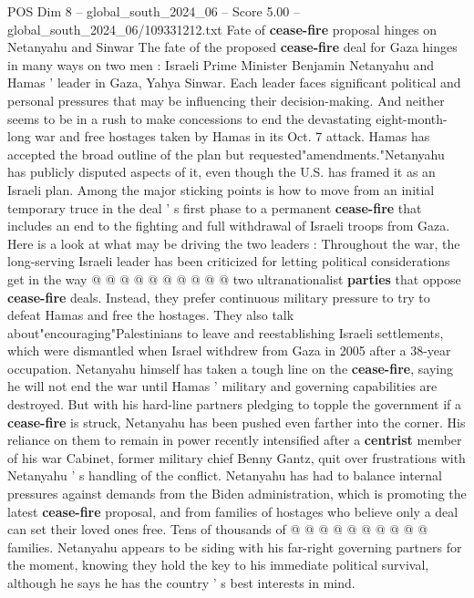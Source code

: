 \begin{textsample}{POS Dim 8 – global\_south\_2024\_06 – Score 5.00 – global\_south\_2024\_06/109331212.txt}  \label{ex:f8_pos_215}
Fate of \textbf{cease-fire} proposal hinges on Netanyahu and Sinwar The fate of the proposed \textbf{cease-fire} deal for Gaza hinges in many ways on two men : Israeli Prime Minister Benjamin Netanyahu and Hamas ' leader in Gaza, Yahya Sinwar.
Each leader faces significant political and personal pressures that may be influencing their decision-making.
And neither seems to be in a rush to make concessions to end the devastating eight-month-long war and free hostages taken by Hamas in its Oct. 7 attack.
Hamas has accepted the broad outline of the plan but requested"amendments."Netanyahu has publicly disputed aspects of it, even though the U.S. has framed it as an Israeli plan.
Among the major sticking points is how to move from an initial temporary truce in the deal ' s first phase to a permanent \textbf{cease-fire} that includes an end to the fighting and full withdrawal of Israeli troops from Gaza.
Here is a look at what may be driving the two leaders : Throughout the war, the long-serving Israeli leader has been criticized for letting political considerations get in the way @ @ @ @ @ @ @ @ @ @ two ultranationalist \textbf{parties} that oppose \textbf{cease-fire} deals.
Instead, they prefer continuous military pressure to try to defeat Hamas and free the hostages.
They also talk about"encouraging"Palestinians to leave and reestablishing Israeli settlements, which were dismantled when Israel withdrew from Gaza in 2005 after a 38-year occupation.
Netanyahu himself has taken a tough line on the \textbf{cease-fire}, saying he will not end the war until Hamas ' military and governing capabilities are destroyed.
But with his hard-line partners pledging to topple the government if a \textbf{cease-fire} is struck, Netanyahu has been pushed even farther into the corner.
His reliance on them to remain in power recently intensified after a \textbf{centrist} member of his war Cabinet, former military chief Benny Gantz, quit over frustrations with Netanyahu ' s handling of the conflict.
Netanyahu has had to balance internal pressures against demands from the Biden administration, which is promoting the latest \textbf{cease-fire} proposal, and from families of hostages who believe only a deal can set their loved ones free.
Tens of thousands of @ @ @ @ @ @ @ @ @ @ families.
Netanyahu appears to be siding with his far-right governing partners for the moment, knowing they hold the key to his immediate political survival, although he says he has the country ' s best interests in mind.

\end{textsample}
